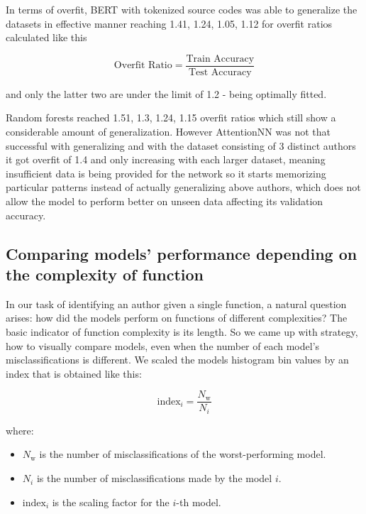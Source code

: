 \documentclass[conference]{IEEEtran}
\begin{document}
In terms of overfit, BERT with tokenized source codes was able to generalize the datasets in effective manner reaching 1.41, 1.24, 1.05, 1.12 for overfit ratios 
calculated like this

\begin{equation}
    \text{Overfit Ratio} = \frac{\text{Train Accuracy}}{\text{Test Accuracy}}
\end{equation}

and only the latter two are under the limit of 1.2 - being optimally fitted. 

Random forests reached 1.51, 1.3, 1.24, 1.15 overfit ratios which still show a considerable amount of generalization. However AttentionNN was not that successful with generalizing 
and with the dataset consisting of 3 distinct authors it got overfit of 1.4 and only increasing with each larger dataset, meaning insufficient data is being provided for the network so it starts memorizing particular 
patterns instead of actually generalizing above authors, which does not allow the model to perform better on unseen data affecting its validation accuracy.



\subsection{Comparing models' performance depending on the complexity of function}

In our task of identifying an author given a single function, a natural question arises: how did the models 
perform on functions of different complexities? The basic indicator of function complexity is its length. So we came up with strategy, 
how to visually compare models, even when the number of each model's misclassifications is different. We scaled the models histogram bin values by 
an index that is obtained like this: 

\begin{equation}
    \text{index}_{i} = \frac{N_{\text{w}}}{N_{i}}
\end{equation}

\noindent where:
\begin{itemize}
    \item $N_{\text{w}}$ is the number of misclassifications of the worst-performing model.
    \item $N_{i}$ is the number of misclassifications made by the model \( i \).
    \item $\text{index}_{i}$ is the scaling factor for the $i$-th model.
\end{itemize}
\end{document}
